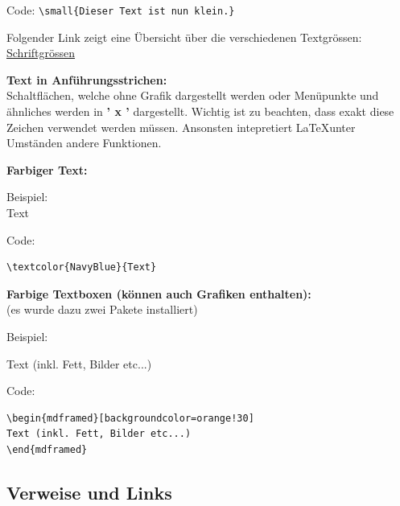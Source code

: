 Code: \verb+\small{Dieser Text ist nun klein.}+

\vspace{\baselineskip}

Folgender Link zeigt eine Übersicht über die verschiedenen Textgrössen: \href{https://de.overleaf.com/learn/latex/Font_sizes,_families,_and_styles}{\color{blue} Schriftgrössen}  

\vspace{\baselineskip}

\textbf{Text in Anführungsstrichen:}\\
Schaltflächen, welche ohne Grafik dargestellt werden oder Menüpunkte und ähnliches werden in \textbf{' x '} dargestellt. Wichtig ist zu beachten, dass exakt diese Zeichen verwendet werden müssen. Ansonsten intepretiert \LaTeX \enspace unter Umständen andere Funktionen.

\vspace{\baselineskip}

\textbf{Farbiger Text:}

Beispiel:\\
\textcolor{NavyBlue}{Text}

Code:

\begin{verbatim}
\textcolor{NavyBlue}{Text}
\end{verbatim}

\vspace{\baselineskip}

\textbf{Farbige Textboxen (können auch Grafiken enthalten):}\\
(es wurde dazu zwei Pakete installiert)

Beispiel:
\begin{mdframed}[backgroundcolor=orange!30] 
Text (inkl. Fett, Bilder etc...)
\end{mdframed}

Code:
\begin{verbatim}
\begin{mdframed}[backgroundcolor=orange!30] 
Text (inkl. Fett, Bilder etc...)
\end{mdframed}
\end{verbatim}




\subsection{Verweise und Links}

